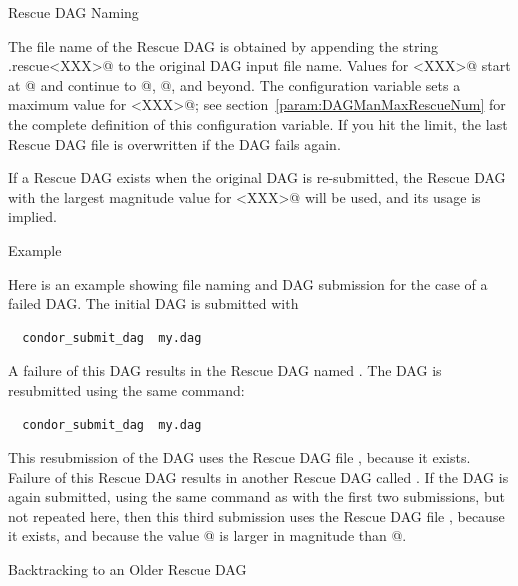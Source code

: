 \label{dagman:rescue_dag_naming}
\begin{description}
\item[Rescue DAG Naming]
\end{description}

The file name of the Rescue DAG is obtained by
appending the string
\verb@.rescue<XXX>@ to the original DAG input file name.
Values for \verb@<XXX>@ start at @ and continue
to @, @, and beyond.
The configuration variable 
sets a maximum value for \verb@<XXX>@;
see section~\ref{param:DAGManMaxRescueNum} for the complete definition
of this configuration variable.  If you hit the
 limit, the last Rescue DAG file
is overwritten if the DAG fails again.

If a Rescue DAG exists when the original DAG is re-submitted,
the Rescue DAG with the largest magnitude value for \verb@<XXX>@
will be used, and its usage is implied.

\label{dagman:rescue_dag_example}
\begin{description}
\item[Example]
\end{description}

Here is an example showing file naming and DAG submission
for the case of a failed DAG.
The initial DAG is submitted with
\begin{verbatim}
  condor_submit_dag  my.dag
\end{verbatim}
A failure of this DAG results in the Rescue DAG
named .
The DAG is resubmitted using the same command: 
\begin{verbatim}
  condor_submit_dag  my.dag
\end{verbatim}
This resubmission of the DAG uses the Rescue DAG file ,
because it exists.
Failure of this Rescue DAG results in another Rescue DAG
called .
If the DAG is again submitted, using the same command
as with the first two submissions, but not repeated here,
then this third submission uses the Rescue DAG file ,
because it exists, and because the value @ is larger
in magnitude than @.

\label{dagman:rescue_dag_backtracking}
\begin{description}
\item[Backtracking to an Older Rescue DAG]
\end{description}

